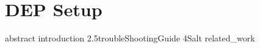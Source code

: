 \chapter{DEP Setup}
\label{chapter:DEPSetup}

{abstract}
{introduction}
{2.5troubleShootingGuide}
{4Salt}
{related_work}

